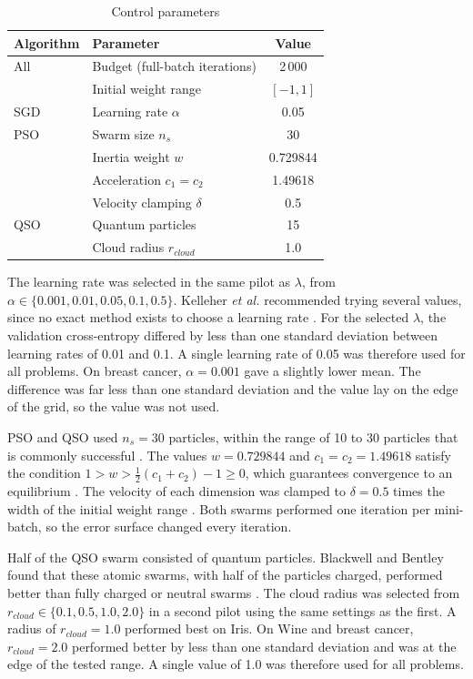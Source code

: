 \documentclass[conference]{IEEEtran}
\begin{document}
\begin{table}[t]
\centering
\caption{Control parameters}
\label{tab:params}
\begin{tabular}{llc}
\toprule
Algorithm & Parameter & Value \\
\midrule
All  & Budget (full-batch iterations) & 2\,000 \\
     & Initial weight range          & $[-1, 1]$ \\
SGD  & Learning rate $\alpha$          & 0.05 \\
PSO  & Swarm size $n_s$              & 30 \\
     & Inertia weight $w$            & 0.729844 \\
     & Acceleration $c_1 = c_2$      & 1.49618 \\
     & Velocity clamping $\delta$    & 0.5 \\
QSO  & Quantum particles             & 15 \\
     & Cloud radius $r_{cloud}$            & 1.0 \\
\bottomrule
\end{tabular}
\end{table}

The learning rate was selected in the same pilot as $\lambda$, from
$\alpha \in \{0.001, 0.01, 0.05, 0.1, 0.5\}$. Kelleher \textit{et al.}
recommended trying several values, since no exact method exists to
choose a learning rate \cite{kelleher2015}. For the selected
$\lambda$, the validation cross-entropy differed by less than one
standard deviation between learning rates of 0.01 and 0.1. A single
learning rate of 0.05 was therefore used for all problems. On breast
cancer, $\alpha = 0.001$ gave a slightly lower mean. The difference was
far less than one standard deviation and the value lay on the edge of
the grid, so the value was not used.

PSO and QSO used $n_s = 30$ particles, within the range of 10 to 30
particles that is commonly successful \cite{engelbrecht2007}.
The values $w = 0.729844$ and $c_1 = c_2 = 1.49618$ satisfy the
condition $1 > w > \frac{1}{2}(c_1 + c_2) - 1 \geq 0$, which
guarantees convergence to an equilibrium
\cite{engelbrecht2007}. The velocity of each dimension
was clamped to $\delta = 0.5$ times the width of the initial weight
range \cite{engelbrecht2007}. Both swarms performed one
iteration per mini-batch, so the error surface changed every
iteration.

Half of the QSO swarm consisted of quantum particles. Blackwell and Bentley 
found that these atomic swarms, with half of the particles charged, performed 
better than fully charged or neutral swarms \cite{engelbrecht2007}. The cloud 
radius was selected from $r_{cloud} \in \{0.1, 0.5, 1.0, 2.0\}$ in a second 
pilot using the same settings as the first. A radius of $r_{cloud} = 1.0$ 
performed best on Iris. On Wine and breast cancer, $r_{cloud} = 2.0$ performed 
better by less than one standard deviation and was at the edge of the tested 
range. A single value of 1.0 was therefore used for all problems.
\end{document}

